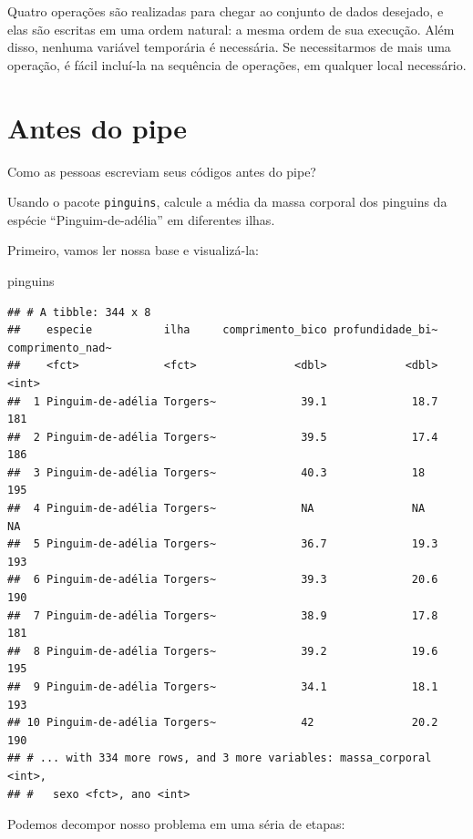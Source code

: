 \documentclass[
]{book}
\newenvironment{Shaded}{\begin{snugshade}}{\end{snugshade}}
\newcommand{\NormalTok}[1]{#1}
\begin{document}
Quatro operações são realizadas para chegar ao conjunto de dados desejado, e
elas são escritas em uma ordem natural: a mesma ordem de sua execução. Além
disso, nenhuma variável temporária é necessária. Se necessitarmos de mais
uma operação, é fácil incluí-la na sequência de operações, em qualquer local
necessário.

\hypertarget{antes-do-pipe}{%
\section{Antes do pipe}\label{antes-do-pipe}}

Como as pessoas escreviam seus códigos antes do pipe?

Usando o pacote \texttt{pinguins}, calcule a média da massa corporal dos pinguins da
espécie ``Pinguim-de-adélia'' em diferentes ilhas.

Primeiro, vamos ler nossa base e visualizá-la:

\begin{Shaded}
\begin{Highlighting}[]
\NormalTok{pinguins}
\end{Highlighting}
\end{Shaded}

\begin{verbatim}
## # A tibble: 344 x 8
##    especie           ilha     comprimento_bico profundidade_bi~ comprimento_nad~
##    <fct>             <fct>               <dbl>            <dbl>            <int>
##  1 Pinguim-de-adélia Torgers~             39.1             18.7              181
##  2 Pinguim-de-adélia Torgers~             39.5             17.4              186
##  3 Pinguim-de-adélia Torgers~             40.3             18                195
##  4 Pinguim-de-adélia Torgers~             NA               NA                 NA
##  5 Pinguim-de-adélia Torgers~             36.7             19.3              193
##  6 Pinguim-de-adélia Torgers~             39.3             20.6              190
##  7 Pinguim-de-adélia Torgers~             38.9             17.8              181
##  8 Pinguim-de-adélia Torgers~             39.2             19.6              195
##  9 Pinguim-de-adélia Torgers~             34.1             18.1              193
## 10 Pinguim-de-adélia Torgers~             42               20.2              190
## # ... with 334 more rows, and 3 more variables: massa_corporal <int>,
## #   sexo <fct>, ano <int>
\end{verbatim}

Podemos decompor nosso problema em uma séria de etapas:
\end{document}
